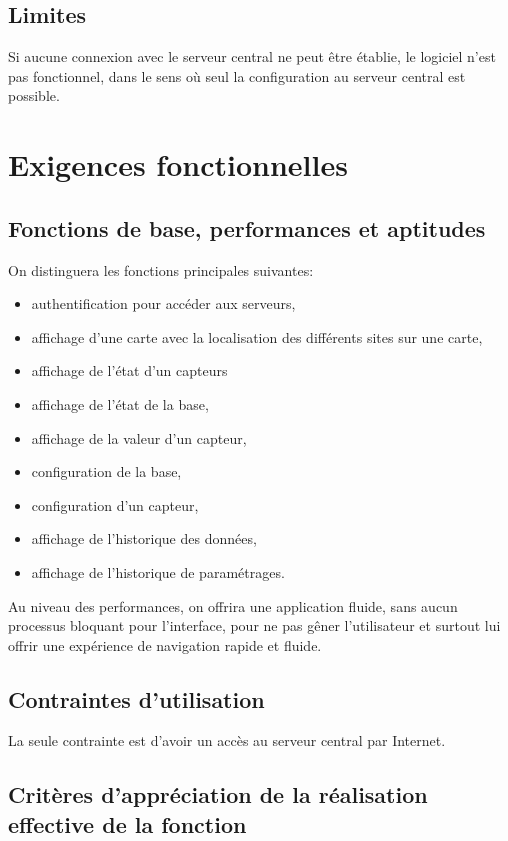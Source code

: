 \subsection{Limites}
Si aucune connexion avec le serveur central ne peut être établie, le logiciel n'est pas fonctionnel, dans le sens où seul la configuration au serveur central est possible.

\section{Exigences fonctionnelles}
\subsection{Fonctions de base, performances et aptitudes}
On distinguera les fonctions principales suivantes:
\begin{itemize}
	\item authentification pour accéder aux serveurs,
	\item affichage d'une carte avec la localisation des différents sites sur une carte,
	\item affichage de l'état d'un capteurs
	\item affichage de l'état de la base,
	\item affichage de la valeur d'un capteur,
	\item configuration de la base,
	\item configuration d'un capteur,
	\item affichage de l'historique des données,
	\item affichage de l'historique de paramétrages.\\
\end{itemize}

Au niveau des performances, on offrira une application fluide, sans aucun processus bloquant pour l'interface, pour ne pas gêner l'utilisateur et surtout lui offrir une expérience de navigation rapide et fluide.

\subsection{Contraintes d'utilisation}
La seule contrainte est d'avoir un accès au serveur central par Internet.

\subsection{Critères d'appréciation de la réalisation effective de la fonction}

